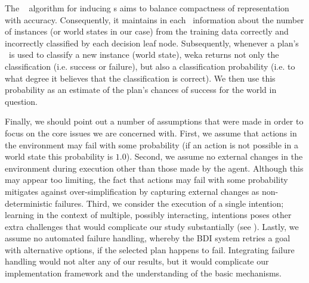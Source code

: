 The \weka\  algorithm for inducing \dt{}s aims to balance
compactness of representation with accuracy. Consequently, it maintains in each
\dt\ information about the number of instances (or world states in our case) from
the training data correctly and incorrectly classified by each decision leaf
node. Subsequently, whenever a plan's \dt\ is used to classify a new instance
(world state), weka returns not only the classification (i.e. success or
failure), but also a classification probability (i.e. to what degree it believes
that the classification is correct). We then use this probability as an estimate
of the plan's chances of success for the world in question.


Finally, we should point out a number of assumptions that were made in order to
focus on the core issues we are concerned with.
First, we assume that actions in the environment may fail with some probability
(if an action is not possible in a world state this probability is $1.0$).
Second, we assume no external changes in the environment during execution other
than those made by the agent. Although this may appear too limiting, the fact
that actions may fail with some probability mitigates against
over-simplification by capturing external changes as
non-deterministic failures.
Third, we consider the execution of a single intention; learning in the context
of multiple, possibly interacting, intentions poses other extra challenges that
would complicate our study substantially (see \cite{Thangarajah02}).
Lastly, we assume no automated failure handling, whereby the BDI system retries
a goal with alternative options, if the selected plan happens to fail. 
Integrating failure handling would not alter any of our results, but it would
complicate our implementation framework and the understanding of the basic
mechanisms.



